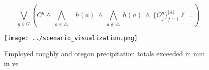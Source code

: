 \documentclass[a4paper]{article}
\begin{document}
\[\bigvee_{g\in G} (C^g \wedge\ \bigwedge_{a\in \triangle}\ \neg h(a)\ \wedge\ \bigwedge_{a\notin \triangle}\ h(a)\ \wedge\ \{O_j^g\}_{j=1}^{|A|} \nvdash\ \bot )\]

\begin{figure}
\centering
\texttt{[image: ../scenario\_visualization.png]}
\caption{Employed roughly and oregon precipitation totals exceeded in mm in ve
}
\end{figure}
 
\end{document}
